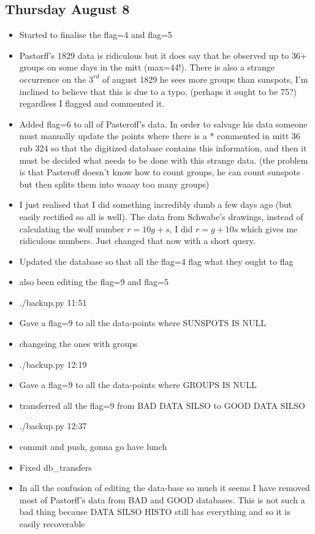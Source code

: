 \documentclass[12pt]{article}
\begin{document}
\subsection{Thursday August 8}
\begin{itemize}
    \item Started to finalise the flag=4 and flag=5
    \item Pastorff's 1829 data is ridiculous but it does say that he observed up to 36+ groups on some days in the mitt (max=44!). There is also a strange occurrence on the $3^{rd}$ of august 1829 he sees more groups than sunspots, I'm inclined to believe that this is due to a typo, (perhaps it ought to be 75?) regardless I flagged and commented it.
    \item Added flag=6 to all of Pasteroff's data. In order to salvage his data someone must manually update the points where there is a * commented in mitt 36 rub 324 so that the digitized database contains this information, and then it must be decided what needs to be done with this strange data. (the problem is that Pasteroff doesn't know how to count groups, he can count sunspots but then splits them into waaay too many groups)
    \item I just realised that I did something incredibly dumb a few days ago (but easily rectified so all is well). The data from Schwabe's drawings, instead of calculating the wolf number $r = 10g + s$, I did $r = g + 10s$ which gives me ridiculous numbers. Just changed that now with a short query.
    \item Updated the database so that all the flag=4 flag what they ought to flag
    \item also been editing the flag=9 and flag=5
    \item ./backup.py 11:51
    \item Gave a flag=9 to all the data-points where SUNSPOTS IS NULL
    \item changeing the ones with groups
    \item ./backup.py 12:19
    \item Gave a flag=9 to all the data-points where GROUPS IS NULL
    \item transferred all the flag=9 from BAD DATA SILSO to GOOD DATA SILSO
    \item ./backup.py 12:37
    \item commit and push, gonna go have lunch
    \item Fixed db\_transfers
    \item In all the confusion of editing the data-base so much it seems I have removed most of Pastorff's data from BAD and GOOD databases. This is not such a bad thing because DATA SILSO HISTO still has everything and so it is easily recoverable

\end{itemize}
\end{document}
